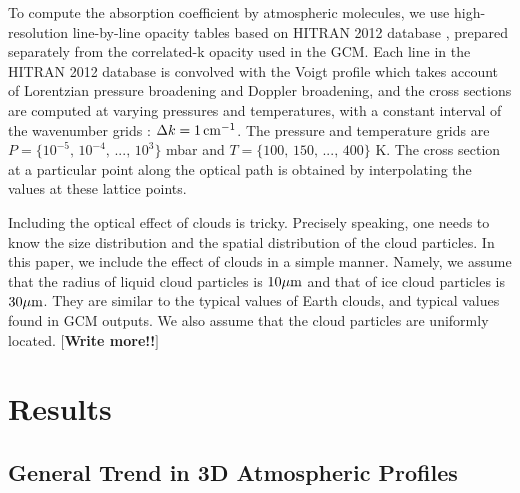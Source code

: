 \documentclass[11pt,numberedappendix,twocolappendix,]{emulateapj}
\def\memo#1{\color{red}$[${\bf #1}$]$ \color{black}}
\begin{document}
To compute the absorption coefficient by atmospheric molecules, we use high-resolution line-by-line opacity tables based on HITRAN 2012 database \citep{Rothman2013}, prepared separately from the correlated-k opacity used in the GCM. 
Each line in the HITRAN 2012 database is convolved with the Voigt profile which takes account of Lorentzian pressure broadening and Doppler broadening, 
and the cross sections are computed at varying pressures and temperatures, with a constant interval of the wavenumber grids : $\Delta k = 1\,{\rm cm}^{-1}$. 
The pressure and temperature grids are $P = \{10^{-5},\, 10^{-4},\,...,\,10^3\}$ mbar and $T = \{100,\, 150,\,...,\, 400\}$ K. 
The cross section at a particular point along the optical path is obtained by interpolating the values at these lattice points. 

Including the optical effect of clouds is tricky. 
Precisely speaking, one needs to know the size distribution and the spatial distribution of the cloud particles. 
In this paper, we include the effect of clouds in a simple manner. 
Namely, we assume that the radius of liquid cloud particles is $10 \mu {\rm m}$ and that of ice cloud particles is $30 \mu {\rm m}$. 
They are similar to the typical values of Earth clouds, and typical values found in GCM outputs. 
We also assume that the cloud particles are uniformly located. 
\memo{Write more!!}

\section{Results}
\label{s:results}

\subsection{General Trend in 3D Atmospheric Profiles}
\label{ss:result_H2Omixingratio}
\end{document}

